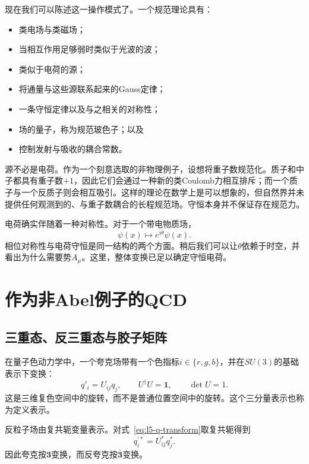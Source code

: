 现在我们可以陈述这一操作模式了。一个规范理论具有：
\begin{itemize}
\item 类电场与类磁场；
\item 当相互作用足够弱时类似于光波的波；
\item 类似于电荷的源；
\item 将通量与这些源联系起来的Gauss定律；
\item 一条守恒定律以及与之相关的对称性；
\item 场的量子，称为规范玻色子；以及
\item 控制发射与吸收的耦合常数。
\end{itemize}
源不必是电荷。作为一个刻意选取的非物理例子，设想将重子数规范化。质子和中子都具有重子数\(+1\)，因此它们会通过一种新的类Coulomb力相互排斥；而一个质子与一个反质子则会相互吸引。这样的理论在数学上是可以想象的，但自然界并未提供任何观测到的、与重子数耦合的长程规范场。守恒本身并不保证存在规范力。

电荷确实伴随着一种对称性。对于一个带电物质场，
\begin{equation}
\psi(x)\longmapsto e^{i\theta}\psi(x).
\label{eq:l5-u1}
\end{equation}
相位对称性与电荷守恒是同一结构的两个方面。稍后我们可以让\(\theta\)依赖于时空，并看出为什么需要势\(A_\mu\)。这里，整体变换已足以确定守恒电荷。

\section{作为非Abel例子的QCD}

\subsection{三重态、反三重态与胶子矩阵}

在量子色动力学中，一个夸克场带有一个色指标\(i\in\{r,g,b\}\)，并在\(SU(3)\)的基础表示下变换：
\begin{equation}
q'_i=U_{ij}q_j,
\qquad
U^\dagger U=\boldsymbol 1,
\qquad
\det U=1.
\label{eq:l5-q-transform}
\end{equation}
这是三维复色空间中的旋转，而不是普通位置空间中的旋转。这个三分量表示也称为定义表示。

反粒子场由复共轭变量表示。对式~\eqref{eq:l5-q-transform}取复共轭得到
\begin{equation}
q_i^{\prime *}=U_{ij}^*q_j^*.
\label{eq:l5-antiquark-transform}
\end{equation}
因此夸克按\(\boldsymbol 3\)变换，而反夸克按\(\bar{\boldsymbol 3}\)变换。

